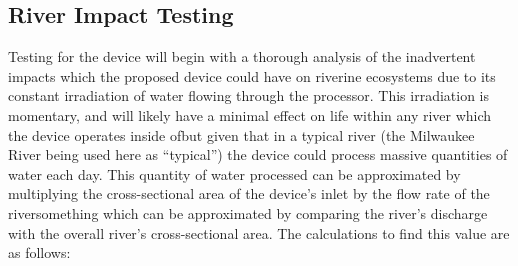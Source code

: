 \documentclass[fleqn,10pt]{SelfArx} %
\begin{document}
	\subsection{River Impact Testing}
	Testing for the device will begin with a thorough analysis of the inadvertent impacts which the proposed device could have on riverine ecosystems due to its constant irradiation of water flowing through the processor. This irradiation is momentary, and will likely have a minimal effect on life within any river which the device operates inside of\textemdash but given that in a typical river (the Milwaukee River being used here as “typical”) the device could process massive quantities of water each day. This quantity of water processed can be approximated by multiplying the cross-sectional area of the device’s inlet by the flow rate of the river\textemdash something which can be approximated by comparing the river’s discharge with the overall river’s cross-sectional area. The calculations to find this value are as follows:
\end{document}
